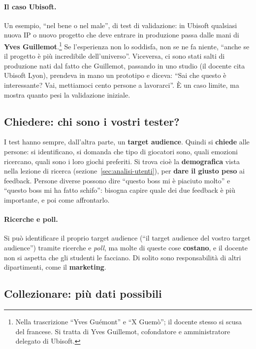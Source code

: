 \paragraph{Il caso Ubisoft.} Un esempio, ``nel bene o nel male'', di test di
validazione: in Ubisoft qualsiasi nuova IP o nuovo progetto che deve entrare
in produzione passa dalle mani di \textbf{Yves Guillemot}.\footnote{Nella
trascrizione ``Yves Guémont'' e ``X Guemò''; il docente stesso si scusa del
francese. Si tratta di Yves Guillemot, cofondatore e amministratore
delegato di Ubisoft.} Se l'esperienza non lo soddisfa, non se ne fa niente,
``anche se il progetto è più incredibile dell'universo''. Viceversa, ci sono
stati salti di produzione nati dal fatto che Guillemot, passando in uno
studio (il docente cita Ubisoft Lyon), prendeva in mano un prototipo e
diceva: ``Sai che questo è interessante? Vai, mettiamoci cento persone a
lavorarci''. È un caso limite, ma mostra quanto pesi la validazione
iniziale.

\subsection{Chiedere: chi sono i vostri tester?}

I test hanno sempre, dall'altra parte, un \textbf{target audience}. Quindi si
\textbf{chiede} alle persone: si identificano, si domanda che tipo di
giocatori sono, quali emozioni ricercano, quali sono i loro giochi
preferiti. Si trova cioè la \textbf{demografica} vista nella lezione di
ricerca (sezione~\ref{sec:analisi-utenti}), per \textbf{dare il giusto peso}
ai feedback. Persone diverse possono dire ``questo boss mi è piaciuto
molto'' e ``questo boss mi ha fatto schifo'': bisogna capire quale dei due
feedback è più importante, e poi come affrontarlo.

\paragraph{Ricerche e poll.} Si può identificare il proprio target audience
(``il target audience del vostro target audience'') tramite ricerche e
\emph{poll}, ma molte di queste cose \textbf{costano}, e il docente non si
aspetta che gli studenti le facciano. Di solito sono responsabilità di altri
dipartimenti, come il \textbf{marketing}.

\subsection{Collezionare: più dati possibili}

